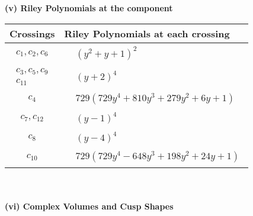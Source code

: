 \documentclass[1p]{elsarticle_modified}
\theoremstyle{definition}
\begin{document}
\newpage\renewcommand{\arraystretch}{1}
\flushleft \textbf{(v) Riley Polynomials at the component}\newline \\
\begin{tabular}{m{50pt}|m{274pt}}
Crossings & \hspace{64pt}Riley Polynomials at each crossing \\
\hline $$\begin{aligned}c_{1},c_{2},c_{6}\end{aligned}$$&$\begin{aligned}
&(y^2+y+1)^2
\end{aligned}$\\
\hline $$\begin{aligned}c_{3},c_{5},c_{9}\\c_{11}\end{aligned}$$&$\begin{aligned}
&(y+2)^4
\end{aligned}$\\
\hline $$\begin{aligned}c_{4}\end{aligned}$$&$\begin{aligned}
&729(729 y^4+810 y^3+279 y^2+6 y+1)
\end{aligned}$\\
\hline $$\begin{aligned}c_{7},c_{12}\end{aligned}$$&$\begin{aligned}
&(y-1)^4
\end{aligned}$\\
\hline $$\begin{aligned}c_{8}\end{aligned}$$&$\begin{aligned}
&(y-4)^4
\end{aligned}$\\
\hline $$\begin{aligned}c_{10}\end{aligned}$$&$\begin{aligned}
&729(729 y^4-648 y^3+198 y^2+24 y+1)
\end{aligned}$\\
\hline
\end{tabular}\\~\\
\newpage\flushleft \textbf{(vi) Complex Volumes and Cusp Shapes}
\end{document}
